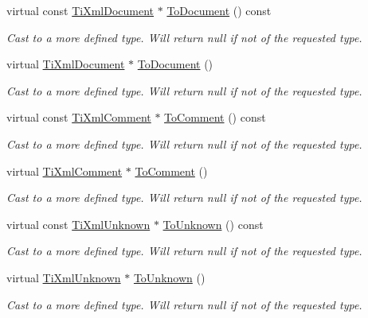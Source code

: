 \begin{DoxyCompactItemize}
virtual const \hyperlink{classTiXmlDocument}{TiXmlDocument} $\ast$ \hyperlink{classTiXmlNode_a8a4cda4b15c29f64cff419309aebed08}{ToDocument} () const 
\begin{DoxyCompactList}\small\item\em Cast to a more defined type. Will return null if not of the requested type. \item\end{DoxyCompactList}\item 
virtual \hyperlink{classTiXmlDocument}{TiXmlDocument} $\ast$ \hyperlink{classTiXmlNode_a6a4c8ac28ee7a745d059db6691e03bae}{ToDocument} ()
\begin{DoxyCompactList}\small\item\em Cast to a more defined type. Will return null if not of the requested type. \item\end{DoxyCompactList}\item 
virtual const \hyperlink{classTiXmlComment}{TiXmlComment} $\ast$ \hyperlink{classTiXmlNode_aa0a5086f9eaee910bbfdc7f975e26574}{ToComment} () const 
\begin{DoxyCompactList}\small\item\em Cast to a more defined type. Will return null if not of the requested type. \item\end{DoxyCompactList}\item 
virtual \hyperlink{classTiXmlComment}{TiXmlComment} $\ast$ \hyperlink{classTiXmlNode_a383e06a0787f7063953934867990f849}{ToComment} ()
\begin{DoxyCompactList}\small\item\em Cast to a more defined type. Will return null if not of the requested type. \item\end{DoxyCompactList}\item 
virtual const \hyperlink{classTiXmlUnknown}{TiXmlUnknown} $\ast$ \hyperlink{classTiXmlNode_afd7205cf31d7a376929f8a36930627a2}{ToUnknown} () const 
\begin{DoxyCompactList}\small\item\em Cast to a more defined type. Will return null if not of the requested type. \item\end{DoxyCompactList}\item 
virtual \hyperlink{classTiXmlUnknown}{TiXmlUnknown} $\ast$ \hyperlink{classTiXmlNode_a06de5af852668c7e4af0d09c205f0b0d}{ToUnknown} ()
\begin{DoxyCompactList}\small\item\em Cast to a more defined type. Will return null if not of the requested type. \item\end{DoxyCompactList}\item 

\end{DoxyCompactItemize}

